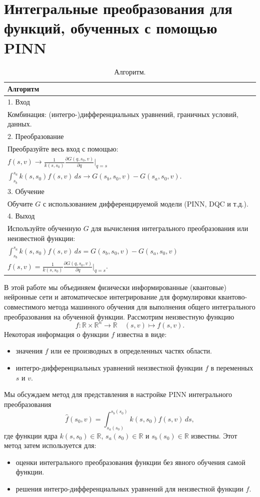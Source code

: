 \documentclass[a4paper,12pt]{article}
\theoremstyle{plain} %
\theoremstyle{definition} %
\theoremstyle{remark} %
\begin{document}
\section{Интегральные преобразования для функций, обученных с помощью PINN}
\begin{table}[h]
\centering
\begin{tabular}{|p{}|}
\hline
\textbf{Алгоритм} \\
\hline
1. Вход \\
Комбинация: (интегро-)дифференциальных уравнений, граничных условий, данных. \\
2. Преобразование \\
Преобразуйте весь вход с помощью: \\
$f(s, v) \rightarrow \frac{1}{k(s, s_0)} \frac{\partial G(q, s_0, v)}{\partial q} \bigg|_{q=s}$ \\
$\int_{s_b}^{s_a} k(s, s_0) f(s, v) \, ds \rightarrow G(s_b, s_0, v) - G(s_a, s_0, v)$. \\
3. Обучение \\
Обучите \(G\) с использованием дифференцируемой модели (PINN, DQC и т.д.). \\
4. Выход \\
Используйте обученную \(G\) для вычисления интегрального преобразования или неизвестной функции: \\
$\int_{s_b}^{s_a} k(s, s_0) f(s, v) \, ds = G(s_b, s_0, v) - G(s_a, s_0, v)$ \\
$f(s, v) = \frac{1}{k(s, s_0)} \frac{\partial G(q, s_0, v)}{\partial q} \bigg|_{q=s}$. \\
\hline
\end{tabular}
\caption{Алгоритм.}
\end{table}
В этой работе мы объединяем физически информированные (квантовые) нейронные сети и автоматическое интегрирование для формулировки квантово-совместимого метода машинного обучения для выполнения общего интегрального преобразования на обученной функции. Рассмотрим неизвестную функцию
\[
f : \mathbb{R} \times \mathbb{R}^n \rightarrow \mathbb{R} \quad (s, v) \mapsto f(s, v).
\]
Некоторая информация о функции \(f\) известна в виде:
\begin{itemize}
    \item значения \(f\) или ее производных в определенных частях области.
    \item интегро-дифференциальных уравнений неизвестной функции \(f\) в переменных \(s\) и \(v\).
\end{itemize}
Мы обсуждаем метод для представления в настройке PINN интегрального преобразования
\[
\hat{f}(s_0, v) = \int_{s_a(s_0)}^{s_b(s_0)} k(s, s_0) f(s, v) \, ds,
\]
где функции ядра \(k(s, s_0) \in \mathbb{R}\), \(s_a(s_0) \in \mathbb{R}\) и \(s_b(s_0) \in \mathbb{R}\) известны. Этот метод затем используется для:
\begin{itemize}
    \item оценки интегрального преобразования функции без явного обучения самой функции.
    \item решения интегро-дифференциальных уравнений для неизвестной функции \(f\).
\end{itemize}
\end{document}
